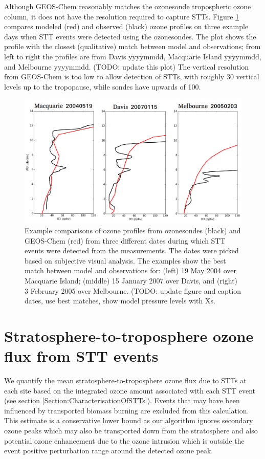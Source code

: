 \documentclass{article}
\begin{document}
  Although GEOS-Chem reasonably matches the ozonesonde tropospheric ozone column, it does not have the resolution required to capture STTs.
  Figure \ref{fig:event_profile_comparison} compares modeled (red) and observed (black) ozone profiles on three example days when STT events were detected using the ozonesondes. 
  The plot shows the profile with the closest (qualitative) match between model and observations; from left to right the profiles are from Davis yyyymmdd, Macquarie Island yyyymmdd, and Melbourne yyyymmdd. (TODO: update this plot)
  The vertical resolution from GEOS-Chem is too low to allow detection of STTs, with roughly 30 vertical levels up to the tropopause, while sondes have upwards of 100.
  
  \begin{figure}[!htbp]
    \includegraphics[width=\textwidth]{figures/event_profile_comparison.png}
    \caption{Example comparisons of ozone profiles from ozonesondes (black) and GEOS-Chem (red) from 		  three different dates during which STT events were detected from the measurements.
      The dates were picked based on subjective visual analysis. 
      The examples show the best match between model and observations for: (left) 19 May 2004 over Macquarie Island;  (middle) 15 January 2007 over Davis, and (right) 3 February 2005 over Melbourne.
      (TODO: update figure and caption dates, use best matches, show model pressure levels with Xs.}
    \label{fig:event_profile_comparison}
  \end{figure}
  
\section{Stratosphere-to-troposphere ozone flux from STT events}
  
  We quantify the mean stratosphere-to-troposphere ozone flux due to STTs at each site based on the integrated ozone amount associated with each STT event (see section \ref{Section:CharacterisationOfSTTs}).
  Events that may have been influenced by transported biomass burning are excluded from this calculation.
  This estimate is a conservative lower bound as our algorithm ignores secondary ozone peaks which may also be transported down from the stratosphere and also potential ozone enhancement due to the ozone intrusion which is outside the event positive perturbation range around the detected ozone peak.
  
\end{document}

